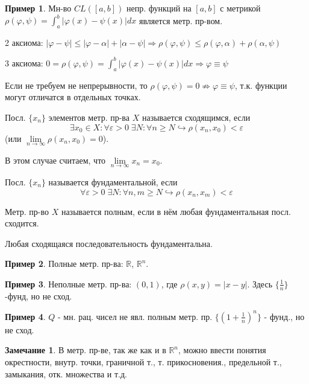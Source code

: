 \documentclass{article}
\theoremstyle{definition}
\numberwithin{theorem}{section}
\numberwithin{lemma}{section}
\numberwithin{definition}{section}
\numberwithin{corollary}{section}
\newtheorem*{eg}{Пример}
\newtheorem*{remark}{Замечание}
\numberwithin{equation}{section}
\let\phi\varphi
\let\epsilon\varepsilon
\let\implies\Rightarrow
\let\true\hookrightarrow
\newcommand\R{\ensuremath{\mathbb{R}}}
\begin{document}
\begin{eg}
  Мн-во $CL([a,b])$ непр. функций на $[a,b]$ с метрикой
  $\rho(\phi, \psi)=\int_{a}^{b}|\phi(x)-\psi(x)|dx$
  является метр. пр-вом.

  2 аксиома: $|\phi-\psi|\le |\phi-\alpha|+|\alpha-\psi|\implies \rho(\phi,\psi)\le \rho(\phi,\alpha)+\rho(\alpha,\psi)$

  3 аксиома: $0=\rho(\phi,\psi)=\int_{a}^{b}|\phi(x)-\psi(x)|dx \implies \phi \equiv \psi$

  Если не требуем не непрерывности, то $\rho(\phi,\psi)=0 \not \implies \phi \equiv \psi$,
  т.к. функции могут отличатся в отдельных точках.
\end{eg}
\begin{definition}
  Посл. $\{x_{n}\}$ элементов метр. пр-ва $X$ называется сходящимся, если
  \[
    \exists x_0\in X: \forall \epsilon>0  \;\exists N: \forall n\ge N \true \rho(x_n,x_0)<\epsilon
  \]
  (или $\lim \limits_{n\to\infty} \rho(x_n,x_0)=0$).

  В этом случае считаем, что $\lim \limits_{n\to\infty}x_n=x_0$.
\end{definition}
\begin{definition}
  Посл. $\{x_n\}$ называется фундаментальной, если
  \[
    \forall \epsilon>0 \; \exists N:\forall n,m \ge N\true \rho(x_n,x_m) < \epsilon
  \]
\end{definition}
\begin{definition}
  Метр. пр-во $X$ называется полным, если в нём любая фундаментальная посл. сходится.
\end{definition}
\begin{theorem}
  Любая сходящаяся последовательность фундаментальна.
\end{theorem}
\begin{eg}
  Полные метр. пр-ва: $\R$, $\R^{n}$.
\end{eg}
\begin{eg}
  Неполные метр. пр-ва: $(0,1)$, где $\rho(x,y)=|x-y|$. 
  Здесь $\{\frac{1}{n}\}$ -фунд, но не сход.
\end{eg}
\begin{eg}
  $Q$ - мн. рац. чисел не явл. полным метр. пр.
  $\{(1+\frac{1}{n})^{n}\}$ - фунд., но не сход.
\end{eg}
\begin{remark}
  В метр. пр-ве, так же как и в $\R^{n}$, можно ввести понятия окрестности,
  внутр. точки, граничной т., т. прикосновения., предельной т.,
  замыкания, отк. множества и т.д.
\end{remark}
\end{document}
